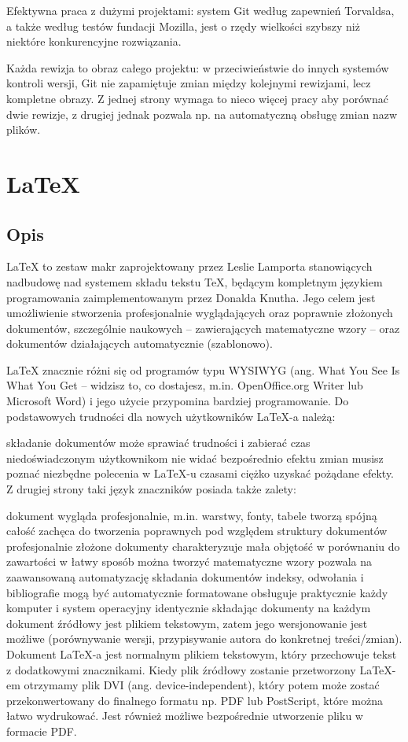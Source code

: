 \documentclass{article}
\begin{document}
Efektywna praca z dużymi projektami: system Git według zapewnień Torvaldsa, a także według testów fundacji Mozilla, jest o rzędy wielkości szybszy niż niektóre konkurencyjne rozwiązania.

Każda rewizja to obraz całego projektu: w przeciwieństwie do innych systemów kontroli wersji, Git nie zapamiętuje zmian między kolejnymi rewizjami, lecz kompletne obrazy. Z jednej strony wymaga to nieco więcej pracy aby porównać dwie rewizje, z drugiej jednak pozwala np. na automatyczną obsługę zmian nazw plików.

\newpage
\section{LaTeX}
\subsection{Opis}
LaTeX to zestaw makr zaprojektowany przez Leslie Lamporta stanowiących nadbudowę nad systemem składu tekstu TeX, będącym kompletnym językiem programowania zaimplementowanym przez Donalda Knutha. Jego celem jest umożliwienie stworzenia profesjonalnie wyglądających oraz poprawnie złożonych dokumentów, szczególnie naukowych – zawierających matematyczne wzory – oraz dokumentów działających automatycznie (szablonowo).

LaTeX znacznie różni się od programów typu WYSIWYG (ang. What You See Is What You Get – widzisz to, co dostajesz, m.in. OpenOffice.org Writer lub Microsoft Word) i jego użycie przypomina bardziej programowanie. Do podstawowych trudności dla nowych użytkowników LaTeX-a należą:

składanie dokumentów może sprawiać trudności i zabierać czas niedoświadczonym użytkownikom
nie widać bezpośrednio efektu zmian
musisz poznać niezbędne polecenia w LaTeX-u
czasami ciężko uzyskać pożądane efekty.
Z drugiej strony taki język znaczników posiada także zalety:

dokument wygląda profesjonalnie, m.in. warstwy, fonty, tabele tworzą spójną całość
zachęca do tworzenia poprawnych pod względem struktury dokumentów
profesjonalnie złożone dokumenty charakteryzuje mała objętość w porównaniu do zawartości
w łatwy sposób można tworzyć matematyczne wzory
pozwala na zaawansowaną automatyzację składania dokumentów
indeksy, odwołania i bibliografie mogą być automatycznie formatowane
obsługuje praktycznie każdy komputer i system operacyjny identycznie składając dokumenty na każdym
dokument źródłowy jest plikiem tekstowym, zatem jego wersjonowanie jest możliwe (porównywanie wersji, przypisywanie autora do konkretnej treści/zmian).
Dokument LaTeX-a jest normalnym plikiem tekstowym, który przechowuje tekst z dodatkowymi znacznikami. Kiedy plik źródłowy zostanie przetworzony LaTeX-em otrzymamy plik DVI (ang. device-independent), który potem może zostać przekonwertowany do finalnego formatu np. PDF lub PostScript, które można łatwo wydrukować. Jest również możliwe bezpośrednie utworzenie pliku w formacie PDF.
\newpage
\end{document}
